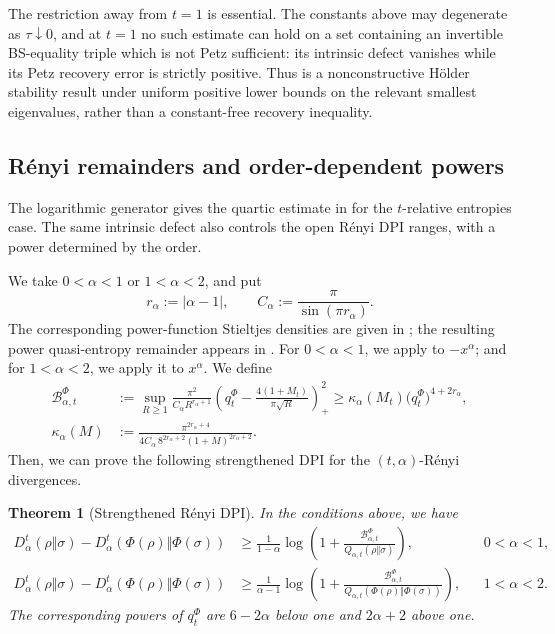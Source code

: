 \documentclass[11pt]{article}
\newtheorem{theorem}[theorem]{Theorem}
\theoremstyle{remark}
\newcommand{\1}{\mathbbm{1}}
\begin{document}
The restriction away from $t=1$ is essential.  The constants above
may degenerate as $\tau\downarrow0$, and at $t=1$ no such estimate can
hold on a set containing an invertible BS-equality triple which is not
Petz sufficient: its intrinsic defect vanishes while its Petz
recovery error is strictly positive.  Thus
 is a nonconstructive
H\"older stability result under uniform positive lower bounds on the
relevant smallest eigenvalues, rather than a
constant-free recovery inequality.

\subsection{R\'enyi remainders and order-dependent powers}

The logarithmic generator gives the quartic estimate in
 for the $t$-relative entropies case.  The same intrinsic defect also
controls the open R\'enyi DPI ranges, with a power determined by the
order.

We take $0<\alpha<1$ or $1<\alpha<2$, and put
\begin{equation}
 r_\alpha:=|\alpha-1|,
 \qquad C_\alpha:=\frac{\pi}{\sin(\pi r_\alpha)}.
\end{equation}
The corresponding power-function Stieltjes densities are given in
\cite[Example~2.3]{carlen2018recovery}; the resulting power
quasi-entropy remainder appears in
\cite[Corollary~5.2]{carlen2018recovery}.
For $0<\alpha<1$, we apply
 to
$-x^\alpha$; and for $1<\alpha<2$, we apply it to $x^\alpha$.
We define
\begin{align}
 \mathcal B_{\alpha,t}^{\Phi}
 &:=\underset{R\geq1}{\sup}\frac{\pi^2}
 {C_\alpha R^{r_\alpha+1}}
 \left(q_t^\Phi-
 \frac{4(1+M_t)}{\pi\sqrt R}\right)_+^2\geq \kappa_\alpha(M_t)
 \bigl(q_t^\Phi\bigr)^{4+2r_\alpha},
 \label{eq:consolidated-Renyi-B}\\
 \kappa_\alpha(M)
 &:=\frac{\pi^{2r_\alpha+4}}
 {4C_\alpha\,8^{2r_\alpha+2}(1+M)^{2r_\alpha+2}}.
\end{align}
Then, we can prove the following strengthened DPI for the $(t,\alpha)$-Rényi divergences.

\begin{theorem}[Strengthened R\'enyi DPI]
\label{thm:consolidated-Renyi-dpi}
In the conditions above, we have
\begin{equation}
 \boxed{
 \begin{aligned}
 D_\alpha^t(\rho\Vert\sigma)
 -D_\alpha^t(\Phi(\rho)\Vert\Phi(\sigma))
 &\geq\frac1{1-\alpha}
 \log\left(1+
 \frac{\mathcal B_{\alpha,t}^{\Phi}}
 {Q_{\alpha,t}(\rho\Vert\sigma)}\right),
 &&0<\alpha<1,\\
 D_\alpha^t(\rho\Vert\sigma)
 -D_\alpha^t(\Phi(\rho)\Vert\Phi(\sigma))
 &\geq\frac1{\alpha-1}
 \log\left(1+
 \frac{\mathcal B_{\alpha,t}^{\Phi}}
 {Q_{\alpha,t}(\Phi(\rho)\Vert\Phi(\sigma))}\right),
 &&1<\alpha<2.
 \end{aligned}}
 \label{eq:consolidated-Renyi-log-bounds}
\end{equation}
The corresponding powers of $q_t^\Phi$ are $6-2\alpha$ below
one and $2\alpha+2$ above one.
\end{theorem}
\end{document}
